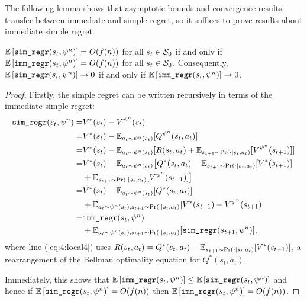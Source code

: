     
    The following lemma shows that asymptotic bounds and convergence results transfer between immediate and simple regret, so it suffices to prove results about immediate simple regret.

    \begin{lemma} 
        \label{lem:imm_regr_to_simp_regr}
        $\mathbb{E}\left[{\textnormal{\texttt{sim\_regr}}}(s_t,\psi^n)\right]=O(f(n))$ for all $s_t\in\mathcal{S}_0$ if and only if $\mathbb{E}\left[{\textnormal{\texttt{imm\_regr}}}(s_t,\psi^n)\right]=O(f(n))$ for all $s_t\in\mathcal{S}_0$. Consequently, $\mathbb{E}\left[{\textnormal{\texttt{sim\_regr}}}(s_t,\psi^n)\right]\rightarrow 0$ if and only if $\mathbb{E}\left[{\textnormal{\texttt{imm\_regr}}}(s_t,\psi^n)\right]\rightarrow 0$. %
    \end{lemma}
    \begin{proof}
        Firstly, the simple regret can be written recursively in terms of the immediate simple regret:
        \begin{align}
            {\textnormal{\texttt{sim\_regr}}}(s_t,\psi^n)
                =& V^*(s_t) - V^{\psi^n}(s_t) \\
                =& V^*(s_t) - \mathbb{E}_{a_t\sim\psi^n(s_t)}[Q^{\psi^n}(s_t,a_t)] \\
                =& V^*(s_t) - \mathbb{E}_{a_t\sim\psi^n(s_t)}[R(s_t,a_t) +    
                    \mathbb{E}_{s_{t+1}\sim\Pr(\cdot|s_t,a_t)}[V^{\psi^n}(s_{t+1})]] \\
                =& V^*(s_t) - \mathbb{E}_{a_t\sim\psi^n(s_t)}\big[Q^*(s_t,a_t) - 
                    \mathbb{E}_{s_{t+1}\sim\Pr(\cdot|s_t,a_t)}[V^*(s_{t+1})]  \notag \\
                    &+ \mathbb{E}_{s_{t+1}\sim\Pr(\cdot|s_t,a_t)}[V^{\psi^n}(s_{t+1})]\big] \label{eq:4:local4} \\
                =& V^*(s_t) - \mathbb{E}_{a_t\sim\psi^n(s_t)}[Q^*(s_t,a_t)] \notag \\
                    &+ \mathbb{E}_{a_t\sim\psi^n(s_t),s_{t+1}\sim\Pr(\cdot|s_t,a_t)}[
                        V^*(s_{t+1}) - V^{\psi^n}(s_{t+1})] \\
                =& {\textnormal{\texttt{imm\_regr}}}(s_t,\psi^n) \notag \\
                    &+ \mathbb{E}_{a_t\sim\psi^n(s_t),s_{t+1}\sim\Pr(\cdot|s_t,a_t)}[{\textnormal{\texttt{sim\_regr}}}(s_{t+1},\psi^n)], \label{eq:4:regret_relation}
        \end{align}
        where line (\ref{eq:4:local4}) uses $R(s_t,a_t) = Q^*(s_t,a_t) - \mathbb{E}_{s_{t+1}\sim\Pr(\cdot|s_t,a_t)}[V^*(s_{t+1})]$, a rearrangement of the Bellman optimality equation for $Q^*(s_t,a_t)$.
        
        Immediately, this shows that $\mathbb{E}\left[{\textnormal{\texttt{imm\_regr}}}(s_t,\psi^n)\right]\leq \mathbb{E}\left[{\textnormal{\texttt{sim\_regr}}}(s_t,\psi^n)\right]$ and hence if $\mathbb{E}\left[{\textnormal{\texttt{sim\_regr}}}(s_t,\psi^n)\right]=O(f(n))$ then $\mathbb{E}\left[{\textnormal{\texttt{imm\_regr}}}(s_t,\psi^n)\right]=O(f(n))$.


\end{proof}
